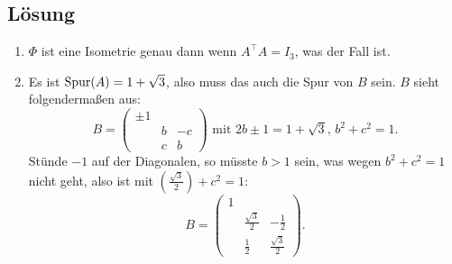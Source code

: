 \subsection{Lösung}
\begin{enumerate}
	\item \( \Phi \) ist eine Isometrie genau dann wenn \( A^\top A = I_3 \), was der Fall ist.
	\item Es ist \( \text{Spur}(A) = 1+\sqrt{3} \), also muss das auch die Spur von \( B \) sein. \( B \) sieht folgendermaßen aus:
	\begin{equation*}
		B = \left(\begin{smallmatrix}
			\pm 1 & & \\
			 & b & -c \\
			 & c & b
		\end{smallmatrix}\right) \text{ mit } 2b \pm 1 = 1+\sqrt{3}\text{, } b^2+c^2=1\text{.}
	\end{equation*}
	Stünde \( -1 \) auf der Diagonalen, so müsste \( b > 1 \) sein, was wegen \( b^2+c^2=1 \) nicht geht, also ist mit \( (\tfrac{\sqrt{3}}{2})+c^2=1 \):
	\begin{equation*}
		B = \begin{pmatrix}
			1 & & \\
			& \tfrac{\sqrt{3}}{2} & -\tfrac{1}{2} \\
			& \tfrac{1}{2} & \tfrac{\sqrt{3}}{2}
		\end{pmatrix}\text{.}
	\end{equation*}


\end{enumerate}
